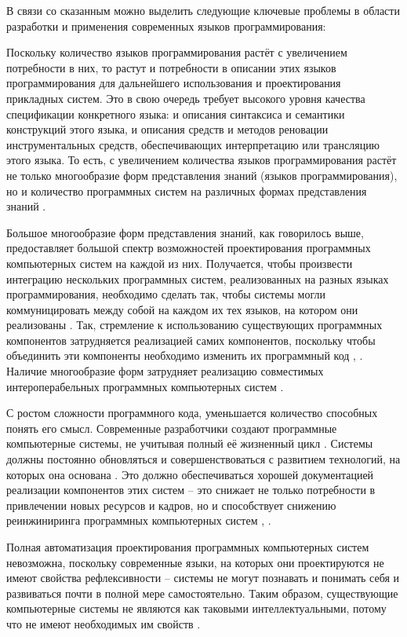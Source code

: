 В связи со сказанным можно выделить следующие ключевые проблемы в области разработки и применения современных языков программирования:
\begin{textitemize}
    \item Поскольку количество языков программирования растёт с увеличением потребности в них, то растут и потребности в описании этих языков программирования для дальнейшего использования и проектирования прикладных систем. Это в свою очередь требует высокого уровня качества спецификации конкретного языка: и описания синтаксиса и семантики конструкций этого языка, и описания средств и методов реновации инструментальных средств, обеспечивающих интерпретацию или трансляцию этого языка. То есть, с увеличением количества языков программирования растёт не только многообразие форм представления знаний (языков программирования), но и количество программных систем на различных формах представления знаний .
    \item Большое многообразие форм представления знаний, как говорилось выше, предоставляет большой спектр возможностей проектирования программных компьютерных систем на каждой из них. Получается, чтобы произвести интеграцию нескольких программных систем, реализованных на разных языках программирования, необходимо сделать так, чтобы системы могли коммуницировать между собой на каждом их тех языков, на котором они реализованы . Так, стремление к использованию существующих программных компонентов затрудняется реализацией самих компонентов, поскольку чтобы объединить эти компоненты необходимо изменить их программный код \cite{Penta2020}, \cite{Scalabrino2016}. Наличие многообразие форм затрудняет реализацию совместимых интероперабельных программных компьютерных систем .
    \item С ростом сложности программного кода, уменьшается количество способных понять его смысл. Современные разработчики создают программные компьютерные системы, не учитывая полный её жизненный цикл \cite{Brooks2021}. Системы должны постоянно обновляться и совершенствоваться с развитием технологий, на которых она основана \cite{Sellitto2022}. Это должно обеспечиваться хорошей документацией реализации компонентов этих систем -- это снижает не только потребности в привлечении новых ресурсов и кадров, но и способствует снижению реинжиниринга программных компьютерных систем \cite{Penta2020}, \cite{Scalabrino2016}.
    \item Полная автоматизация проектирования программных компьютерных систем невозможна, поскольку современные языки, на которых они проектируются не имеют свойства рефлексивности -- системы не могут познавать и понимать себя и развиваться почти в полной мере самостоятельно. Таким образом, существующие компьютерные системы не являются как таковыми интеллектуальными, потому что не имеют необходимых им свойств .

\end{textitemize}
